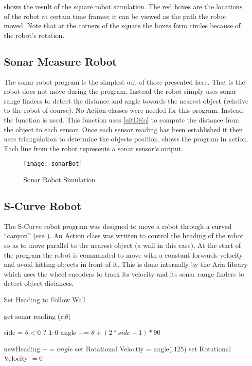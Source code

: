 \documentclass[main.tex]{subfiles}
\begin{document}
 shows the result of the square robot simulation. The red
boxes are the locations of the robot at certain time frames; it can be viewed as
the path the robot moved. Note that at the corners of the square the boxes form
circles because of the robot's rotation.

\subsection{Sonar Measure Robot} 

The sonar robot program is the simplest out of those presented here. That is the
robot does not move during the program.  Instead the robot simply uses sonar
range finders to detect the distance and angle towards the nearest object
(relative to the robot of course). No Action classes were needed for this
program. Instead the  function  is used.
This function uses \eqref{ultDEq} to compute the distance from the object to
each sensor. Once each sensor reading has been established it then uses
triangulation to determine the objects position.  shows the
program in action. Each line from the robot represents a sonar sensor's output.

\begin{figure}[H]
\begin{center}
\texttt{[image: sonarBot]}
\end{center}
\caption{Sonar Robot Simulation}
\label{fig:sonarSim}
\end{figure}

\subsection{S-Curve Robot}

The S-Curve robot program was designed to move a robot through a curved
``canyon'' (see ). An Action class was written to control the
heading of the robot so as to move parallel to the nearest object (a wall in
this case). At the start of the program the robot is commanded to move with a
constant forwards velocity and avoid hitting objects in front of it. This is
done internally by the Aria library which uses the wheel encoders to track its
velocity and its sonar range finders to detect object distances.

\begin{algorithm}
\caption{Set Heading to Follow Wall}
\label{al:folWall}
\begin{algorithmic}
\STATE get sonar reading (r,$\theta$)

\STATE side = $\theta < 0$ ? $1 : 0$
\STATE angle += $\theta + (2*side-1)*90$

	\STATE newHeading $+= angle$
	\STATE set Rotational Veloctiy = angle($.125)$
\ELSE 
	\STATE set Rotational Velocity $= 0$
\ENDIF

\end{algorithmic}
\end{algorithm}
\end{document}

